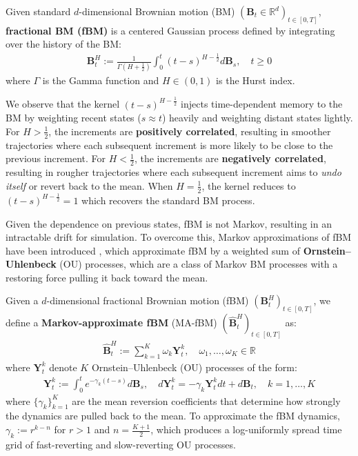 \documentclass{article}
\newcommand{\boldtext}[1]{\textbf{\textcolor{MyGreen}{#1}}}
\begin{document}
\begin{definition}
    Given standard $d$-dimensional Brownian motion (BM) $(\boldsymbol{B}_t\in \mathbb{R}^d)_{t\in [0,T]}$, \textbf{fractional BM (fBM)} is a centered Gaussian process defined by integrating over the history of the BM:
    \begin{align}
        \boldsymbol{B}_t^H:=\frac{1}{\Gamma\left(H+\frac{1}{2}\right)}\int_0^t(t-s)^{H-\frac{1}{2}}d\boldsymbol{B}_s, \quad t\geq 0
    \end{align}
    where $\Gamma$ is the Gamma function and $H\in (0,1)$ is the Hurst index.
\end{definition}
We observe that the kernel $(t-s)^{H-\frac{1}{2}}$ injects time-dependent memory to the BM by weighting recent states ($s\approx t$) heavily and weighting distant states lightly. For $H> \frac{1}{2}$, the increments are \textbf{positively correlated}, resulting in smoother trajectories where each subsequent increment is more likely to be close to the previous increment. For $H<\frac{1}{2}$, the increments are \textbf{negatively correlated}, resulting in rougher trajectories where each subsequent increment aims to \textit{undo itself} or revert back to the mean. When $H=\frac{1}{2}$, the kernel reduces to $(t-s)^{H-\frac{1}{2}}=1$ which recovers the standard BM process.

Given the dependence on previous states, fBM is not Markov, resulting in an intractable drift for simulation. To overcome this, Markov approximations of fBM have been introduced \citep{harms2019affine, daems2023variational}, which approximate fBM by a weighted sum of \boldtext{Ornstein–Uhlenbeck} (OU) processes, which are a class of Markov BM processes with a restoring force pulling it back toward the mean. 

\begin{definition}
    Given a $d$-dimensional fractional Brownian motion (fBM) $(\boldsymbol{B}_t^H)_{t\in [0,T]}$, we define a \textbf{Markov-approximate fBM} (MA-fBM) $(\widehat{\boldsymbol{B}}_t^H)_{t\in [0,T]}$ as:
    \begin{align}
        \widehat{\boldsymbol{B}}_t^H:=\sum_{k=1}^K\omega_k\boldsymbol{Y}_t^k, \quad\omega_1, \dots, \omega_K\in\mathbb{R}
    \end{align}
    where $\boldsymbol{Y}_t^k$ denote $K$ Ornstein–Uhlenbeck (OU) processes of the form:
    \begin{align}
        \boldsymbol{Y}_t^k:=\int_0^te^{-\gamma_k(t-s)}d\boldsymbol{B}_s, \quad d\boldsymbol{Y}_t^k=-\gamma_k\boldsymbol{Y}_t^kdt+d\boldsymbol{B}_t, \quad k=1, \dots, K\label{eq:def-Yt}
    \end{align}
    where  $\{\gamma_k\}_{k=1}^K$ are the mean reversion coefficients that determine how strongly the dynamics are pulled back to the mean. To approximate the fBM dynamics, $\gamma_k:=r^{k-n}$ for $r> 1$ and $n=\frac{K+1}{2}$, which produces a log-uniformly spread time grid of fast-reverting and slow-reverting OU processes.
\end{definition}
\end{document}
